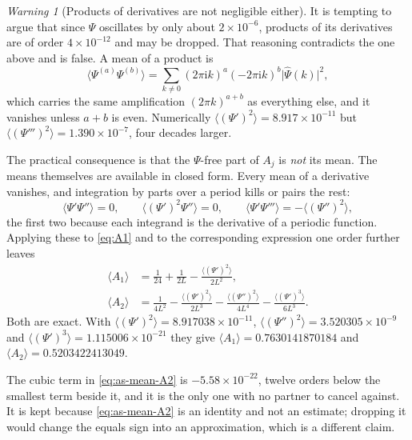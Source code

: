 \documentclass[11pt,oneside]{article}
\theoremstyle{definition}
\theoremstyle{remark}
\newtheorem{warning}[theorem]{Warning}
\newcommand{\ii}{\mathrm i}
\begin{document}
\begin{warning}[Products of derivatives are not negligible either]
\label{warn:as-products}
It is tempting to argue that since $\Psi$ oscillates by only about $2\times10^{-6}$, products
of its derivatives are of order $4\times10^{-12}$ and may be dropped.  That reasoning
contradicts the one above and is false.  A mean of a product is
\begin{equation}
 \bigl\langle\Psi^{(a)}\Psi^{(b)}\bigr\rangle
 =\sum_{k\ne0}(2\pi\ii k)^{a}(-2\pi\ii k)^{b}\bigl|\widehat\Psi(k)\bigr|^{2},
                                                          \label{eq:as-product-mean}
\end{equation}
which carries the same amplification $(2\pi k)^{a+b}$ as everything else, and it vanishes
unless $a+b$ is even.  Numerically
$\langle(\Psi')^{2}\rangle=8.917\times10^{-11}$ but
$\langle(\Psi''')^{2}\rangle=1.390\times10^{-7}$, four decades larger.

The practical consequence is that the $\Psi$-free part of $A_j$ is \emph{not} its mean.  The
means themselves are available in closed form.  Every mean of a derivative vanishes, and
integration by parts over a period kills or pairs the rest:
\begin{equation}
 \langle\Psi'\Psi''\rangle=0,\qquad
 \langle(\Psi')^{2}\Psi''\rangle=0,\qquad
 \langle\Psi'\Psi'''\rangle=-\langle(\Psi'')^{2}\rangle,   \label{eq:as-parts-identities}
\end{equation}
the first two because each integrand is the derivative of a periodic function.  Applying
these to \eqref{eq:A1} and to the corresponding expression one order further leaves
\begin{align}
 \langle A_1\rangle&=\frac1{24}+\frac1{2L}
   -\frac{\langle(\Psi')^{2}\rangle}{2L^{2}},               \label{eq:as-mean-A1}\\
 \langle A_2\rangle&=\frac1{4L^{2}}
   -\frac{\langle(\Psi')^{2}\rangle}{2L^{3}}
   -\frac{\langle(\Psi'')^{2}\rangle}{4L^{4}}
   -\frac{\langle(\Psi')^{3}\rangle}{6L^{3}}.               \label{eq:as-mean-A2}
\end{align}
Both are exact.  With
$\langle(\Psi')^{2}\rangle=8.917038\times10^{-11}$,
$\langle(\Psi'')^{2}\rangle=3.520305\times10^{-9}$ and
$\langle(\Psi')^{3}\rangle=1.115006\times10^{-21}$ they give
$\langle A_1\rangle=0.7630141870184$ and $\langle A_2\rangle=0.5203422413049$.

The cubic term in \eqref{eq:as-mean-A2} is $-5.58\times10^{-22}$, twelve orders below the
smallest term beside it, and it is the only one with no partner to cancel against.  It is
kept because \eqref{eq:as-mean-A2} is an identity and not an estimate; dropping it would
change the equals sign into an approximation, which is a different claim.


\end{warning}
\end{document}
